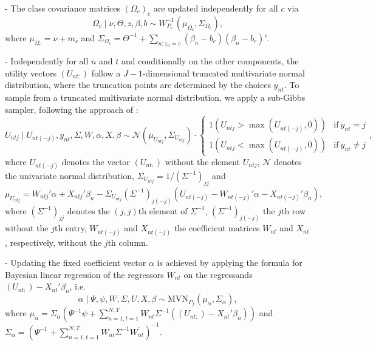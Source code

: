 \documentclass[article]{jss}
\begin{document}
- The class covariance matrices $(\Omega_c)_c$ are updated independently for all $c$ via
\begin{equation}
\Omega_c \mid \nu,\Theta,z,\beta,b \sim W^{-1}_{P_r}(\mu_{\Omega_c},\Sigma_{\Omega_c}),
\end{equation}
where $\mu_{\Omega_c}=\nu+m_c$ and $\Sigma_{\Omega_c}=\Theta^{-1} + \sum_{n:z_n=c} (\beta_n-b_c)(\beta_n-b_c)'$.

- Independently for all $n$ and $t$ and conditionally on the other components, the utility vectors $(U_{nt:})$ follow a $J-1$-dimensional truncated multivariate normal distribution, where the truncation points are determined by the choices $y_{nt}$. To sample from a truncated multivariate normal distribution, we apply a sub-Gibbs sampler, following the approach of \cite{Geweke:1998}:
\begin{equation}
U_{ntj} \mid U_{nt(-j)},y_{nt},\Sigma,W,\alpha,X,\beta
\sim \mathcal{N}(\mu_{U_{ntj}},\Sigma_{U_{ntj}}) \cdot \begin{cases}
1(U_{ntj}>\max(U_{nt(-j)},0) ) & \text{if}~ y_{nt}=j\\
1(U_{ntj}<\max(U_{nt(-j)},0) ) & \text{if}~ y_{nt}\neq j
\end{cases},
\end{equation}
where $U_{nt(-j)}$ denotes the vector $(U_{nt:})$ without the element $U_{ntj}$, $\mathcal{N}$ denotes the univariate normal distribution, $\Sigma_{U_{ntj}} = 1/(\Sigma^{-1})_{jj}$ and
\begin{equation}
\mu_{U_{ntj}} = W_{ntj}'\alpha + X_{ntj}'\beta_n - \Sigma_{U_{ntj}} (\Sigma^{-1})_{j(-j)}   (U_{nt(-j)} - W_{nt(-j)}'\alpha - X_{nt(-j)}' \beta_n ),
\end{equation}
where $(\Sigma^{-1})_{jj}$ denotes the $(j,j)$th element of $\Sigma^{-1}$, $(\Sigma^{-1})_{j(-j)}$ the $j$th row without the $j$th entry, $W_{nt(-j)}$ and $X_{nt(-j)}$ the coefficient matrices $W_{nt}$ and $X_{nt}$, respectively, without the $j$th column.

- Updating the fixed coefficient vector $\alpha$ is achieved by applying the formula for Bayesian linear regression of the regressors $W_{nt}$ on the regressands $(U_{nt:})-X_{nt}'\beta_n$, i.e.
\begin{equation}
\alpha \mid \Psi,\psi,W,\Sigma,U,X,\beta \sim \text{MVN}_{P_f}(\mu_\alpha,\Sigma_\alpha),
\end{equation}
where $\mu_\alpha = \Sigma_\alpha (\Psi^{-1}\psi + \sum_{n=1,t=1}^{N,T} W_{nt} \Sigma^{-1} ((U_{nt:})-X_{nt}'\beta_n) )$ and $\Sigma_\alpha = (\Psi^{-1} + \sum_{n=1,t=1}^{N,T} W_{nt}\Sigma^{-1} W_{nt}^{'} )^{-1}$.
\end{document}
